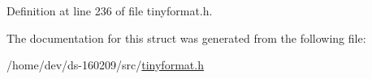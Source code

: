 Definition at line 236 of file tinyformat.\+h.



The documentation for this struct was generated from the following file\+:\begin{DoxyCompactItemize}
\item 
/home/dev/ds-\/160209/src/\hyperlink{tinyformat_8h}{tinyformat.\+h}\end{DoxyCompactItemize}
